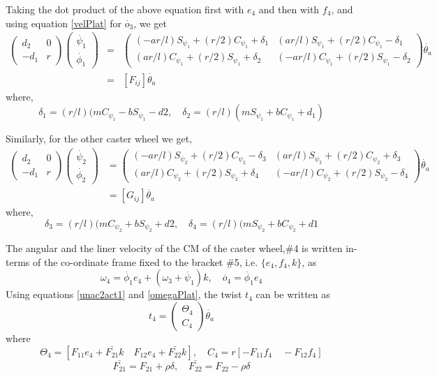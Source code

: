 Taking the dot product of the above equation first with $e_4$ and then with $f_4$, and using equation \ref{velPlat} for $\dot{o_3}$, we get
\begin{eqnarray}
\label{unac2act1}
\begin{pmatrix}
d_2&0\\-d_1 &r
\end{pmatrix}
\begin{pmatrix}
\dot{\psi_1}\\ \dot{\phi_1}
\end{pmatrix}
&=&\begin{pmatrix}
(-ar/l)S_{\psi_1}+(r/2)C_{\psi_1}+\delta_1 & 
(ar/l)S_{\psi_1}+(r/2)C_{\psi_1}-\delta_1 \\
(ar/l)C_{\psi_1}+(r/2)S_{\psi_1}+\delta_2 & 
(-ar/l)C_{\psi_1}+(r/2)S_{\psi_1}-\delta_2 
\end{pmatrix}\dot{\theta_a}\nonumber \\
&=&[F_{ij}]\dot{\theta_a}
\end{eqnarray}
where, 
\[ \delta_1=(r/l)(mC_{\psi_1}-bS_{\psi_1}-d2, \quad  \delta_2=(r/l)(mS_{\psi_1}+bC_{\psi_1}+d_1) \]

Similarly, for the other caster wheel we get,
\begin{align}
\label{unac2act2}
\begin{pmatrix}
d_2&0\\-d_1 &r
\end{pmatrix}
\begin{pmatrix}
\dot{\psi_2}\\ \dot{\phi_2}
\end{pmatrix}
&=\begin{pmatrix}
(-ar/l)S_{\psi_2}+(r/2)C_{\psi_2}-\delta_3 & 
(ar/l)S_{\psi_2}+(r/2)C_{\psi_2}+\delta_3 \\
(ar/l)C_{\psi_2}+(r/2)S_{\psi_2}+\delta_4 & 
(-ar/l)C_{\psi_2}+(r/2)S_{\psi_2}-\delta_4 
\end{pmatrix}\dot{\theta_a}\nonumber \\
&=[G_{ij}]\dot{\theta_a}
\end{align}
where, 
\[ \delta_3=(r/l)(mC_{\psi_2}+bS_{\psi_2}+d2, \quad  \delta_4=(r/l)(mS_{\psi_2}+bC_{\psi_2}+d1 \]




 The angular and the liner velocity of the CM of the caster wheel,\#4 is  written in-terms of the co-ordinate frame fixed to the bracket \#5, i.e. $\{e_4,f_4,k\}$, as
\begin{equation}
\label{omegacastor1}
\omega_4=\dot{\phi_1}e_4+(\omega_3+\dot{\psi_1})k, \quad
\dot{o_4}=\dot{\phi_1}e_4
\end{equation}
Using equations \ref{unac2act1} and \ref{omegaPlat}, the twist $t_4$ can be written as
\begin{equation}
\label{twist4}
t_4=\begin{pmatrix}
\Theta_4\\C_4
\end{pmatrix}\dot{\theta_a}
\end{equation}
where
\[ \Theta_4=[F_{11}e_4+\bar{F_{21}}k \quad F_{12}e_4+\bar{F_{22}}k],\quad 
C_4=r[-F_{11}f_4 \quad -F_{12}f_4]\]
\[\bar{F_{21}}=F_{21}+\rho \delta, \quad \bar{F_{22}}=F_{22}-\rho\delta\]

